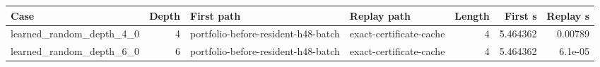 {\small
\begin{tabular}{lrllrrr}
\hline
Case & Depth & First path & Replay path & Length & First s & Replay s \\
\hline
learned\_random\_depth\_4\_0 & 4 & portfolio-before-resident-h48-batch & exact-certificate-cache & 4 & 5.464362 & 0.00789 \\
learned\_random\_depth\_6\_0 & 6 & portfolio-before-resident-h48-batch & exact-certificate-cache & 4 & 5.464362 & 6.1e-05 \\
\hline
\end{tabular}
}

